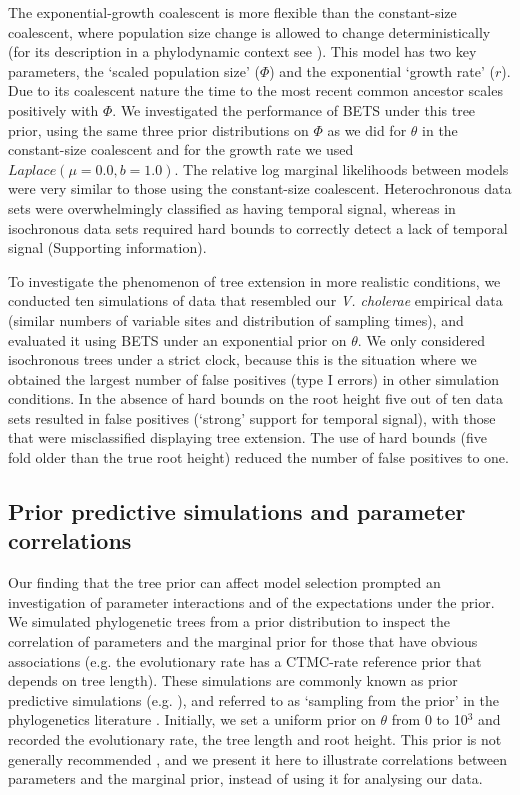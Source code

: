\documentclass[10pt,letterpaper]{article}
\begin{document}
The exponential-growth coalescent is more flexible than the constant-size coalescent, where population size change is allowed to change deterministically (for its description in a phylodynamic context see \cite{volz2012complex, dearlove2013coalescent}). This model has two key parameters, the `scaled population size' ($\Phi$) and the exponential `growth rate' ($r$). Due to its coalescent nature the time to the most recent common ancestor scales positively with $\Phi$. We investigated the performance of BETS under this tree prior, using the same three prior distributions on $\Phi$ as we did for $\theta$ in the constant-size coalescent and for the growth rate we used $Laplace(\mu=0.0, b=1.0)$. The relative log marginal likelihoods between models were very similar to those using the constant-size coalescent. Heterochronous data sets were overwhelmingly classified as having temporal signal, whereas in isochronous data sets required hard bounds to correctly detect a lack of temporal signal (Supporting information). 

{To investigate the phenomenon of tree extension in more realistic conditions, we conducted ten simulations of data that resembled our \textit{V. cholerae} empirical data (similar numbers of variable sites and distribution of sampling times), and evaluated it using BETS under an exponential prior on $\theta$. We only considered isochronous trees under a strict clock, because this is the situation where we obtained the largest number of false positives (type I errors) in other simulation conditions. In the absence of hard bounds on the root height five out of ten data sets resulted in false positives (`strong' support for temporal signal), with those that were misclassified displaying tree extension. The use of hard bounds (five fold older than the true root height) reduced the number of false positives to one.} 

\subsection*{Prior predictive simulations and parameter correlations}
Our finding that the tree prior can affect model selection prompted an investigation of parameter interactions and of the expectations under the prior. We simulated phylogenetic trees from a prior distribution to inspect the correlation of parameters and the marginal prior for those that have obvious associations (e.g. the evolutionary rate has a CTMC-rate reference prior that depends on tree length). These simulations are commonly known as prior predictive simulations (e.g. \cite{wesner2021choosing}), and referred to as `sampling from the prior' in the phylogenetics literature \cite{nascimento2017biologist}. Initially, we set a uniform prior on $\theta$ from 0 to 10$^3$ and recorded the evolutionary rate, the tree length and root height. This prior is not generally recommended \cite{bouckaertDating}, and we present it here to illustrate correlations between parameters and the marginal prior, instead of using it for analysing our data.
\end{document}
